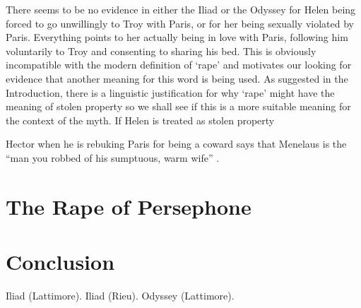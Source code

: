 \documentclass[11pt]{article}
\begin{document}
There seems to be no evidence in either the Iliad or the Odyssey for Helen being forced to go unwillingly to Troy with Paris, or for her being sexually violated by Paris.
Everything points to her actually being in love with Paris, following him voluntarily to Troy and consenting to sharing his bed.
This is obviously incompatible with the modern definition of `rape' and motivates our looking for evidence that another meaning for this word is being used.
As suggested in the Introduction, there is a linguistic justification for why `rape' might have the meaning of stolen property so we shall see if this is a more suitable meaning for the context of the myth.
If Helen is treated as stolen property 

Hector when he is rebuking Paris for being a coward says that Menelaus is the ``man you robbed of his sumptuous, warm wife'' \cite[book 3, line 61]{iliad}.










\section{The Rape of Persephone}


\section{Conclusion}


\newpage

\begin{thebibliography}{9}
		Iliad (Lattimore).
		Iliad (Rieu).
		Odyssey (Lattimore).
\end{thebibliography}
\end{document}
